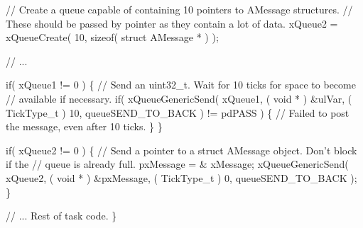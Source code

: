 \begin{DoxyPre}   // Create a queue capable of containing 10 pointers to AMessage structures.
   // These should be passed by pointer as they contain a lot of data.
   xQueue2 = xQueueCreate( 10, sizeof( struct AMessage * ) );\end{DoxyPre}



\begin{DoxyPre}   // ...\end{DoxyPre}



\begin{DoxyPre}   if( xQueue1 != 0 )
   \{
    // Send an uint32\_t.  Wait for 10 ticks for space to become
    // available if necessary.
    if( xQueueGenericSend( xQueue1, ( void * ) \&ulVar, ( TickType\_t ) 10, queueSEND\_TO\_BACK ) != pdPASS )
    \{
        // Failed to post the message, even after 10 ticks.
    \}
   \}\end{DoxyPre}



\begin{DoxyPre}   if( xQueue2 != 0 )
   \{
    // Send a pointer to a struct AMessage object.  Don't block if the
    // queue is already full.
    pxMessage = \& xMessage;
    xQueueGenericSend( xQueue2, ( void * ) \&pxMessage, ( TickType\_t ) 0, queueSEND\_TO\_BACK );
   \}\end{DoxyPre}



\begin{DoxyPre}   // ... Rest of task code.
\}
\end{DoxyPre}
 